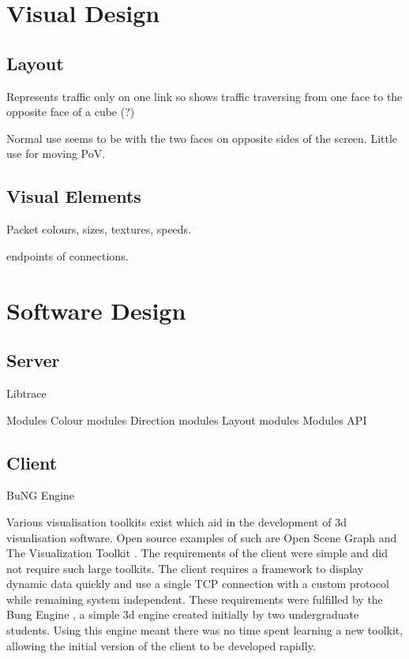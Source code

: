 
\section{Visual Design}
\label{visual}

\subsection{Layout}

Represents traffic only on one link so shows traffic traversing from one face to the opposite face of a cube (?)

Normal use seems to be with the two faces on opposite sides of the screen.  Little use for moving PoV.

\subsection{Visual Elements}

Packet colours, sizes, textures, speeds.

endpoints of connections.

\section{Software Design}
\label{software}

\subsection{Server}

Libtrace

Modules
	Colour modules
	Direction modules
	Layout modules
Modules API


\subsection{Client}


BuNG Engine

Various visualisation toolkits exist which aid in the development of 3d
visualisation software. Open source examples of such are Open Scene Graph
\cite{web:osg} and The Visualization Toolkit \cite{web:vtk}. The requirements
of the client were simple and did not require such large toolkits. The client
requires a framework to display dynamic data quickly and use a single TCP
connection with a custom protocol while remaining system independent. These
requirements were fulfilled by the Bung Engine \cite{web:bung}, a simple 3d
engine created initially by two undergraduate students. Using this engine
meant there was no time spent learning a new toolkit, allowing the initial
version of the client to be developed rapidly.

